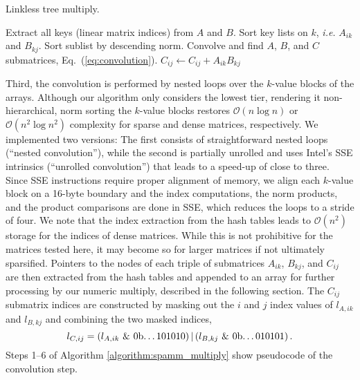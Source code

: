 \begin{algorithm}
\caption{\label{algorithm:spamm_multiply} Linkless tree \SpAMM{} multiply.}
\begin{algorithmic}[1]
\STATE Extract all keys (linear matrix indices) from $A$ and $B$.
\STATE Sort key lists on $k$, {\it i.e.} $A_{ik}$ and $B_{kj}$.
  \STATE Sort sublist by descending norm.
\ENDFOR
\STATE Convolve and find $A$, $B$, and $C$ submatrices,
Eq.~(\ref{eq:convolution}).
  \STATE $C_{ij} \leftarrow C_{ij} + A_{ik} B_{kj}$
\ENDFOR
\end{algorithmic}
\end{algorithm}

\noindent Third, the convolution is performed by nested loops over the
$k$-value blocks of the arrays. Although our algorithm only considers the
lowest tier, rendering it non-hierarchical, norm sorting the $k$-value blocks
restores $\mathcal{O} \left( n \log n \right)$ or $\mathcal{O} \left( n^{2}
\log n^{2} \right)$ complexity for sparse and dense matrices, respectively.
We implemented two versions: The first consists of straightforward nested
loops (``nested convolution''), while the second is partially unrolled and
uses Intel's SSE intrinsics (``unrolled convolution'') that leads to a
speed-up of close to three. Since SSE instructions require proper alignment of
memory, we align each $k$-value block on a 16-byte boundary and the index
computations, the norm products, and the product comparisons are done in SSE,
which reduces the loops to a stride of four. We note that the index extraction
from the hash tables leads to $\mathcal{O} \left( n^{2} \right)$ storage for
the indices of dense matrices.  While this is not prohibitive for the matrices
tested here, it may become so for larger matrices if not ultimately
sparsified.  Pointers to the nodes of each triple of submatrices $A_{ik}$,
$B_{kj}$, and $C_{ij}$ are then extracted from the hash tables and appended to
an array for further processing by our numeric multiply, described in the
following section. The $C_{ij}$ submatrix indices are constructed by masking
out the $i$ and $j$ index values of $l_{A, ik}$ and $l_{B, kj}$ and combining
the two masked indices,
\begin{equation}
\label{eq:convolution}
l_{C, ij}  =
\left( l_{A, ik} \,\, \& \,\, \mbox{0b\dots101010} \right)
|
\left( l_{B, kj} \,\, \& \,\, \mbox{0b\dots010101} \right).
\end{equation}
Steps 1--6 of Algorithm \ref{algorithm:spamm_multiply} show pseudocode of the
convolution step.

